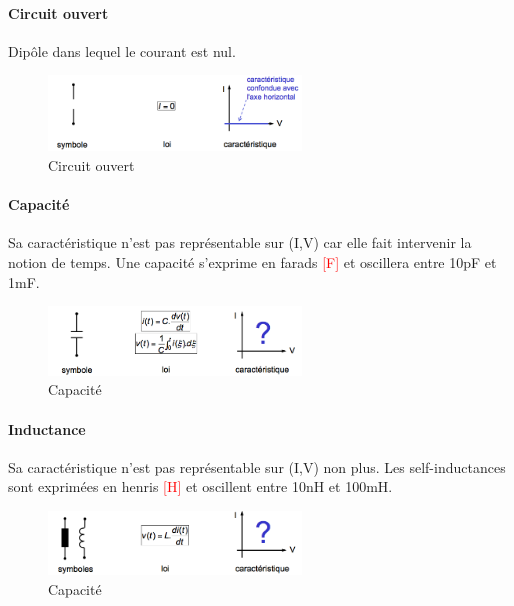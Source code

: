 \documentclass[a4paper]{article}
\begin{document}
    \paragraph{Circuit ouvert} Dipôle dans lequel le courant est nul.
    \begin{figure}[H]
        \begin{center}
            \includegraphics[width=0.6\textwidth]{fig/2_circuitouvert.png}
            \caption{Circuit ouvert}
        \end{center}
    \end{figure}

    \paragraph{Capacité} Sa caractéristique n'est pas représentable sur (I,V) car
    elle fait intervenir la notion de temps. Une capacité s'exprime en farads
    \textcolor{red}{[F]} et oscillera entre 10pF et 1mF.
    \begin{figure}[H]
        \begin{center}
            \includegraphics[width=0.6\textwidth]{fig/2_capacite.png}
            \caption{Capacité}
        \end{center}
    \end{figure}

    \paragraph{Inductance} Sa caractéristique n'est pas représentable sur (I,V) non plus.
    Les self-inductances sont exprimées en henris \textcolor{red}{[H]} et oscillent
    entre 10nH et 100mH.
    \begin{figure}[H]
        \begin{center}
            \includegraphics[width=0.6\textwidth]{fig/2_inductance.png}
            \caption{Capacité}
        \end{center}
    \end{figure}
\end{document}
